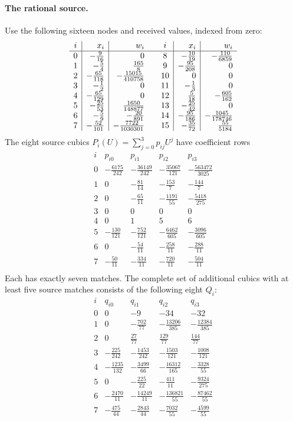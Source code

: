 \documentclass[10pt]{article}
\begin{document}
\paragraph{The rational source.}
Use the following sixteen nodes and received values, indexed from zero:
\[
\begin{array}{c|r|r@{\qquad}c|r|r}
i&x_i&w_i&i&x_i&w_i\\\hline
0&-\frac{9}{16}&0&8&-\frac{10}{19}&-\frac{110}{6859}\\
1&-\frac{5}{4}&\frac{165}{8}&9&-\frac{95}{208}&0\\
2&-\frac{65}{118}&-\frac{15015}{410758}&10&0&0\\
3&-\frac{1}{2}&0&11&-\frac{1}{3}&0\\
4&-\frac{65}{129}&0&12&\frac{5}{18}&-\frac{605}{162}\\
5&-\frac{25}{53}&\frac{1650}{148877}&13&-\frac{25}{42}&0\\
6&-\frac{5}{9}&-\frac{20}{891}&14&-\frac{95}{186}&-\frac{1045}{178746}\\
7&-\frac{52}{101}&-\frac{7722}{1030301}&15&-\frac{35}{72}&\frac{55}{5184}\\
\end{array}\]
The eight source cubics $P_i(U)=\sum_{j=0}^3p_{ij}U^j$ have coefficient rows
\[
\begin{array}{c|rrrr}i&p_{i0}&p_{i1}&p_{i2}&p_{i3}\\\hline
0&-\frac{6175}{242}&-\frac{36149}{242}&-\frac{35067}{121}&-\frac{563472}{3025}\\
1&0&-\frac{81}{14}&-\frac{153}{7}&-\frac{144}{7}\\
2&0&-\frac{65}{11}&-\frac{1191}{55}&-\frac{5418}{275}\\
3&0&0&0&0\\
4&0&1&5&6\\
5&-\frac{130}{121}&-\frac{752}{121}&-\frac{6462}{605}&-\frac{3096}{605}\\
6&0&-\frac{54}{11}&-\frac{258}{11}&-\frac{288}{11}\\
7&-\frac{50}{11}&-\frac{334}{11}&-\frac{720}{11}&-\frac{504}{11}\\
\end{array}\]
Each has exactly seven matches. The complete set of additional cubics with at least five source matches consists of the following eight $Q_i$:
\[
\begin{array}{c|rrrr}i&q_{i0}&q_{i1}&q_{i2}&q_{i3}\\\hline
0&0&-9&-34&-32\\
1&0&-\frac{702}{77}&-\frac{13206}{385}&-\frac{12384}{385}\\
2&0&\frac{27}{77}&\frac{129}{77}&\frac{144}{77}\\
3&-\frac{225}{242}&-\frac{1453}{242}&-\frac{1503}{121}&-\frac{1008}{121}\\
4&-\frac{1235}{132}&-\frac{3499}{66}&-\frac{16312}{165}&-\frac{3328}{55}\\
5&0&-\frac{225}{22}&-\frac{411}{11}&-\frac{9324}{275}\\
6&-\frac{2470}{11}&-\frac{14249}{11}&-\frac{136821}{55}&-\frac{87462}{55}\\
7&-\frac{475}{44}&-\frac{2843}{44}&-\frac{7032}{55}&-\frac{4599}{55}\\
\end{array}\]
\end{document}
